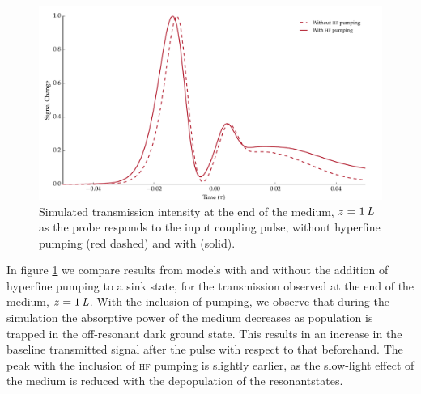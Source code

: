     \begin{figure}[]
      \includegraphics[width=\linewidth]{figs/06_simultons/mb_vee2g_exp_build_plot_1_2_fig1.pdf}
      \caption{
      Simulated transmission intensity at the end of the medium,
      $z=\unit[1]{\textit{L}}$ as the probe responds to the input coupling
      pulse, without hyperfine pumping (red dashed) and with (solid).
      }
      \label{fig:hf_pumping} 
    \end{figure}

    In figure \ref{fig:hf_pumping} we compare results from models with and
    without the addition of hyperfine pumping to a sink state, for the
    transmission observed at the end of the medium, $z=\unit[1]{\textit{L}}$.
    With the inclusion of pumping, we observe that during the simulation the
    absorptive power of the medium decreases as population is trapped in the
    off-resonant dark ground state. This results in an increase in the baseline
    transmitted signal after the pulse with respect to that beforehand. The peak
    with the inclusion of \textsc{hf} pumping is slightly earlier, as the 
    slow-light effect of the medium is reduced with the depopulation of the
    resonantstates.
